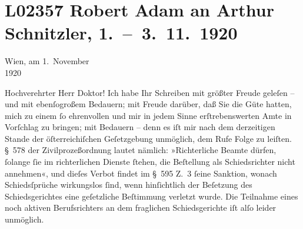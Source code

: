 

\section[Robert Adam an Arthur Schnitzler, 1. – 3. 11. 1920]{L02357 Robert Adam an Arthur Schnitzler, 1. – 3. 11. 1920}
\nopagebreak{}
\rehead{ }\normalsize\beginnumbering{}
\toendnotes[C]{\smallbreak\pagebreak[2]}
\toendnotes[C]{\smallbreak}
\toendnotes[C]{\smallbreak}
\pstart
           \raggedleft{}{\pb}Wien, am 1. November{\\}1920\pend
           
\pstart\center{}Hochverehrter Herr Doktor!\pend\vspace{0.5em}
\pstart
           Ich habe Ihr Schreiben mit größter Freude geleſen – und mit ebenſogroßem Bedauern;
               mit Freude darüber, daß Sie die Güte hatten, mich zu einem{ }ſo ehrenvollen und mir in
               jedem Sinne erſtrebenswerten Amte in Vorſchlag zu bringen; mit Bedauern – denn es iſt
               mir nach dem derzeitigen Stande der öſterreichiſchen Geſetzgebung unmöglich, dem Rufe
               Folge zu leiſten. § 578 der Zivilprozeßordnung lautet nämlich: »Richterliche Beamte
               dürfen,{ }ſolange{ }ſie im richterlichen Dienste{ }ſtehen, die Beſtellung als
               Schiedsrichter nicht annehmen«, und dieſes Verbot findet im § 595 Z. 3{ }ſeine
               Sanktion, wonach Schiedsſprüche wirkungs{\pb}los{ }ſind, wenn hinſichtlich der Beſetzung des Schiedsgerichtes eine geſetzliche
               Beſtimmung verletzt wurde. Die Teilnahme eines noch aktiven Berufsrichters an dem
               fraglichen Schiedsgerichte iſt alſo leider unmöglich.\pend
           
